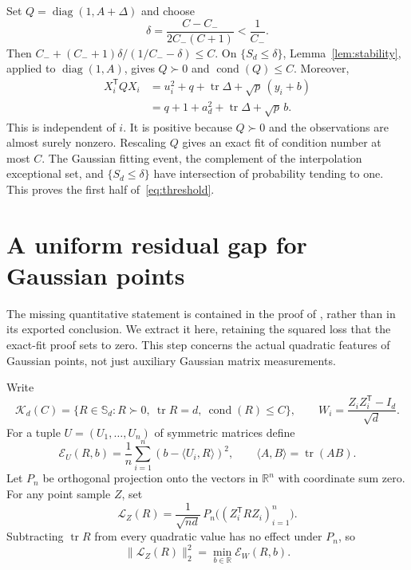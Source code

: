 \documentclass[11pt]{article}
\newcommand{\R}{\mathbb R}
\newcommand{\Sym}{\mathbb S}
\DeclareMathOperator{\tr}{tr}
\DeclareMathOperator{\cond}{cond}
\newcommand{\norm}[1]{\lVert#1\rVert}
\theoremstyle{remark}
\begin{document}
Set $Q=\operatorname{diag}(1,A+\Delta)$ and choose
\[
 \delta=\frac{C-C_-}{2C_-(C+1)}<\frac1{C_-}.
\]
Then $C_-+(C_-+1)\delta/(1/C_--\delta)\le C$.
On $\{S_d\le\delta\}$, Lemma~\ref{lem:stability}, applied to
$\operatorname{diag}(1,A)$, gives $Q\succ0$ and $\cond(Q)\le C$.
Moreover,
\begin{align*}
 X_i^{\mathsf T}QX_i
 &=u_i^2+q+\tr\Delta+\sqrt p\,(y_i+b)\\
 &=q+1+a_d^2+\tr\Delta+\sqrt p\,b.
\end{align*}
This is independent of $i$. It is positive because $Q\succ0$ and the
observations are almost surely nonzero. Rescaling $Q$ gives an exact
fit of condition number at most $C$. The Gaussian fitting event, the
complement of the interpolation exceptional set, and $\{S_d\le\delta\}$
have intersection of probability tending to one. This proves the first half
of~\eqref{eq:threshold}.

\section{A uniform residual gap for Gaussian points}
\label{sec:data-gap}

The missing quantitative statement is contained in the proof of
, rather than in its exported conclusion.
We extract it here, retaining the squared loss that the exact-fit proof
sets to zero. This step concerns the actual quadratic features of
Gaussian points, not just auxiliary Gaussian matrix measurements.

Write
\[
 \mathcal K_d(C)=\{R\in\Sym_d:R\succ0,\ \tr R=d,\ \cond(R)\le C\},
 \qquad W_i=\frac{Z_iZ_i^{\mathsf T}-I_d}{\sqrt d}.
\]
For a tuple $U=(U_1,\ldots,U_n)$ of symmetric matrices define
\[
 \mathcal E_U(R,b)=\frac1n\sum_{i=1}^n
                    (b-\langle U_i,R\rangle)^2,
 \qquad \langle A,B\rangle=\tr(AB).
\]
Let $P_n$ be orthogonal projection onto the vectors in $\R^n$ with
coordinate sum zero. For any point sample $Z$, set
\begin{equation}\label{eq:centered-measurements}
 \mathcal L_Z(R)=\frac1{\sqrt{nd}}\,
                  P_n\bigl((Z_i^{\mathsf T}RZ_i)_{i=1}^n\bigr).
\end{equation}
Subtracting $\tr R$ from every quadratic value has no effect under
$P_n$, so
\begin{equation}\label{eq:loss-identity}
 \norm{\mathcal L_Z(R)}_2^2=\min_{b\in\R}\mathcal E_W(R,b).
\end{equation}
\end{document}
